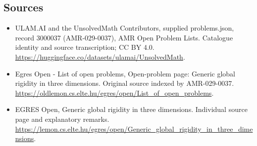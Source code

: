 \documentclass[11pt,a4paper]{article}
\begin{document}
\subsection{Sources}
\begin{itemize}
\item[S1] ULAM.AI and the UnsolvedMath Contributors, supplied problems.json, record 3000037 (AMR-029-0037), AMR Open Problem Lists. Catalogue identity and source transcription; CC BY 4.0.
\url{https://huggingface.co/datasets/ulamai/UnsolvedMath}.
\item[S2] Egres Open - List of open problems, Open-problem page: Generic global rigidity in three dimensions. Original source indexed by AMR-029-0037.
\url{https://oldlemon.cs.elte.hu/egres/open/List_of_open_problems}.
\item[S3] EGRES Open, Generic global rigidity in three dimensions. Individual source page and explanatory remarks.
\url{https://lemon.cs.elte.hu/egres/open/Generic_global_rigidity_in_three_dimensions}.
\end{itemize}
\end{document}
